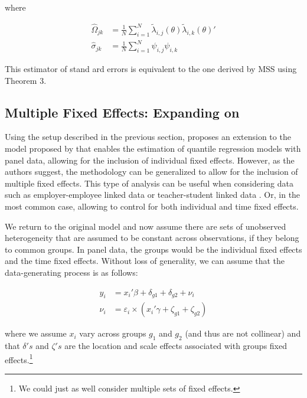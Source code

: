 \documentclass[
  authoryear,
  review,
  1p]{elsarticle}
\begin{document}
where

\[\begin{aligned}
\hat\Omega_{jk} &= \frac{1}{N} \sum_{i=1}^N \tilde \lambda_{i,j}(\theta) \tilde \lambda_{i,k}(\theta)' \\
\hat\sigma_{jk} &= \frac{1}{N} \sum_{i=1}^N \psi_{i,j} \psi_{i,k}
\end{aligned}
\]

This estimator of stand ard errors is equivalent to the one derived by
MSS using Theorem 3.

\hypertarget{multiple-fixed-effects-expanding-on-mss2019}{%
\subsection{\texorpdfstring{Multiple Fixed Effects: Expanding on
\citet{mss2019}}{Multiple Fixed Effects: Expanding on @mss2019}}\label{multiple-fixed-effects-expanding-on-mss2019}}

Using the setup described in the previous section, \citet{mss2019}
proposes an extension to the model proposed by \citet{he1997} that
enables the estimation of quantile regression models with panel data,
allowing for the inclusion of individual fixed effects. However, as the
authors suggest, the methodology can be generalized to allow for the
inclusion of multiple fixed effects. This type of analysis can be useful
when considering data such as employer-employee linked data
\citep{abowed2006} or teacher-student linked data
\citep{harrissass2011}. Or, in the most common case, allowing to control
for both individual and time fixed effects.

We return to the original model and now assume there are sets of
unobserved heterogeneity that are assumed to be constant across
observations, if they belong to common groups. In panel data, the groups
would be the individual fixed effects and the time fixed effects.
Without loss of generality, we can assume that the data-generating
process is as follows:

\[\begin{aligned}
  y_{i} &= x_{i}' \beta + \delta_{g1} + \delta_{g2} + \nu_i \\
  \nu_i &= \varepsilon_i \times (x_{i}' \gamma + \zeta_{g1} + \zeta_{g2})   
  \end{aligned}
\]

where we assume \(x_{i}\) vary across groups \(g_1\) and \(g_2\) (and
thus are not collinear) and that \(\delta's\) and \(\zeta's\) are the
location and scale effects associated with groups fixed
effects.\footnote{We could just as well consider multiple sets of fixed
  effects.}
\end{document}
